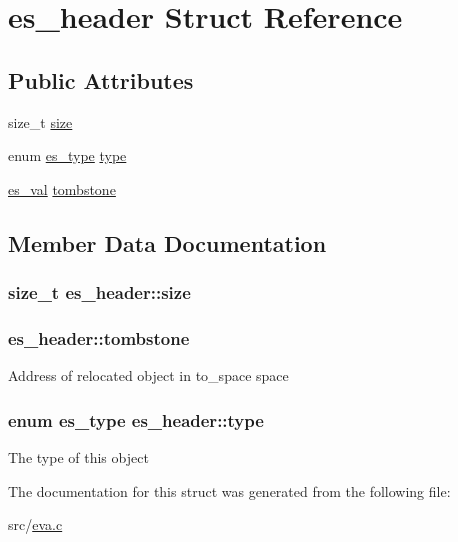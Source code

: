 \hypertarget{structes__header}{\section{es\-\_\-header Struct Reference}
\label{structes__header}
}
\subsection*{Public Attributes}
\begin{DoxyCompactItemize}
\item 
size\-\_\-t \hyperlink{structes__header_a534765342b16530ebed45aa2f59e32fd}{size}
\item 
enum \hyperlink{eva_8h_afb2a28d46d0b66051a7247034894eb62}{es\-\_\-type} \hyperlink{structes__header_a8be13fa6e8012a0336d2b3ac37194873}{type}
\item 
\hyperlink{eva_8h_a8333c63b2093a13aab6d419c87680d7f}{es\-\_\-val} \hyperlink{structes__header_afadfaf9e4cf9cc8bcf56bc7cea4eeea0}{tombstone}
\end{DoxyCompactItemize}


\subsection{Member Data Documentation}
\hypertarget{structes__header_a534765342b16530ebed45aa2f59e32fd}{
\subsubsection[{size}]{\setlength{\rightskip}{0pt plus 5cm}size\-\_\-t es\-\_\-header\-::size}}\label{structes__header_a534765342b16530ebed45aa2f59e32fd}
\hypertarget{structes__header_afadfaf9e4cf9cc8bcf56bc7cea4eeea0}{
\subsubsection[{tombstone}]{ es\-\_\-header\-::tombstone}}\label{structes__header_afadfaf9e4cf9cc8bcf56bc7cea4eeea0}
Address of relocated object in to\-\_\-space space \hypertarget{structes__header_a8be13fa6e8012a0336d2b3ac37194873}{
\subsubsection[{type}]{\setlength{\rightskip}{0pt plus 5cm}enum {\bf es\-\_\-type} es\-\_\-header\-::type}}\label{structes__header_a8be13fa6e8012a0336d2b3ac37194873}
The type of this object 

The documentation for this struct was generated from the following file\-:\begin{DoxyCompactItemize}
\item 
src/\hyperlink{eva_8c}{eva.\-c}\end{DoxyCompactItemize}
